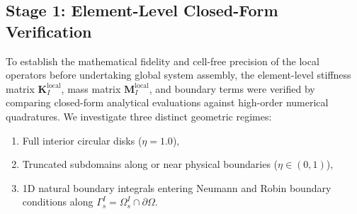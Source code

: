 \documentclass[VANCOUVER,Times1COL]{WileyNJD-v5}
\begin{document}
\subsection{Stage 1: Element-Level Closed-Form Verification}
\label{subsec:stage1_results}

To establish the mathematical fidelity and cell-free precision of the local operators before undertaking global system assembly, the element-level stiffness matrix $\mathbf{K}_I^{\mathrm{local}}$, mass matrix $\mathbf{M}_I^{\mathrm{local}}$, and boundary terms were verified by comparing closed-form analytical evaluations against high-order numerical quadratures. We investigate three distinct geometric regimes:
\begin{enumerate}
    \item Full interior circular disks ($\eta = 1.0$),
    \item Truncated subdomains along or near physical boundaries ($\eta \in (0, 1)$),
    \item 1D natural boundary integrals entering Neumann and Robin boundary conditions along $\Gamma_s^I = \Omega_s^I \cap \partial\Omega$.
\end{enumerate}
\end{document}
